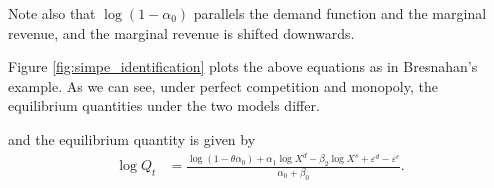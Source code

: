 \documentclass[11pt, a4paper]{article}
\theoremstyle{remark}
\begin{document}
Note also that $\log (1 - \alpha_0)$ parallels the demand function and the marginal revenue, and the marginal revenue is shifted downwards.

Figure \ref{fig:simpe_identification} plots the above equations as in Bresnahan's example.
As we can see, under perfect competition and monopoly, the equilibrium quantities under the two models differ.

and the equilibrium quantity is given by
\begin{align}
    \log Q_t &= \frac{ \log (1 - \theta \alpha_0 ) + \alpha_1 \log X^{d}- \beta_2 \log X^{s} + \varepsilon^{d} - \varepsilon^{c}}{\alpha_0 + \beta_0 }.\label{eq:quantity_loglinear}
\end{align}
\end{document}
